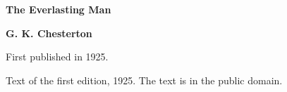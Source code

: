 \documentclass[11pt,letterpaper]{article}
\begin{document}
\color{ink}

\begin{titlepage}
\centering
\vspace*{4em}
{\LARGE\bfseries\color{heading} The Everlasting Man\par}
\vspace{2em}
{\Large\bfseries\color{heading} G. K. Chesterton\par}
\vspace{2.5em}
{\itshape\color{subhead}\parbox{0.8\linewidth}{\centering First published in 1925.\par}}
\vfill
{\small Text of the first edition, 1925. The text is in the public domain.\par}
\vspace{2em}
\end{titlepage}

\tableofcontents


\end{document}
